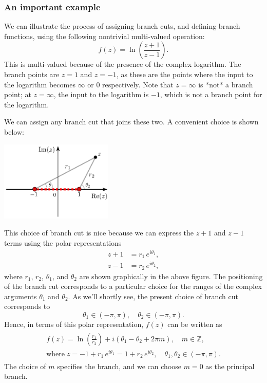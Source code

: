 \documentclass[10pt,a4paper]{article}
\begin{document}
\subsubsection{An important example}
\label{an-important-example}

We can illustrate the process of assigning branch cuts, and defining
branch functions, using the following nontrivial multi-valued
operation:
\begin{equation}
f(z) = \ln\left(\frac{z+1}{z-1}\right).
\end{equation}
This is multi-valued because of the presence of the complex
logarithm. The branch points are $z = 1$ and $z = -1$, as these are
the points where the input to the logarithm becomes $\infty$ or $0$
respectively. Note that $z = \infty$ is *not* a branch point; at $z =
\infty$, the input to the logarithm is $-1$, which is not a branch
point for the logarithm.

We can assign any branch cut that joins these two. A convenient choice
is shown below:

\begin{center}
  \includegraphics[width=0.4\textwidth]{branch_cut_example}
\end{center}

\noindent
This choice of branch cut is nice because we can express the $z+1$ and
$z - 1$ terms using the polar representations
\begin{align}
  z + 1 &= r_1\,e^{i\theta_1}, \\
  z - 1 &= r_2\, e^{i\theta_2},
\end{align}
where $r_1$, $r_2$, $\theta_1$, and $\theta_2$ are shown
graphically in the above figure. The positioning of the branch cut
corresponds to a particular choice for the ranges of the complex
arguments $\theta_1$ and $\theta_2$. As we'll shortly see, the
present choice of branch cut corresponds to
\begin{equation}
\theta_1 \in (-\pi,\pi), \quad \theta_2 \in (-\pi,\pi).
\end{equation}
Hence, in terms of this polar representation, $f(z)$ can be written as
\begin{align}
  \begin{aligned}
    f(z) = \ln\left(\frac{r_1}{r_2}\right) + i(\theta_1 - \theta_2 + 2\pi m), \quad m\in\mathbb{Z}, \\
    \mathrm{where}\; z = -1 + r_1\,e^{i\theta_1} = 1 + r_2\,e^{i\theta_2},\quad\theta_1, \theta_2 \in (-\pi,\pi).
  \end{aligned}
\end{align}
The choice of $m$ specifies the branch, and we can choose $m = 0$ as
the principal branch.
\end{document}
